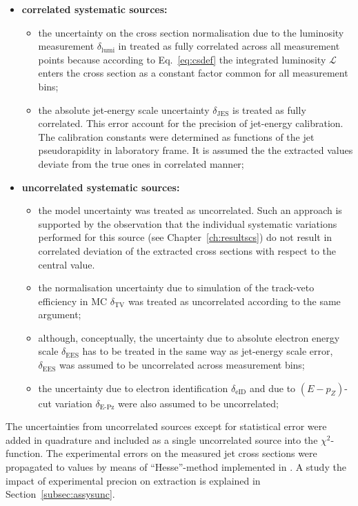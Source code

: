 \begin{itemize}
 \item \textbf{correlated systematic sources:}
 \begin{itemize}
 \item the uncertainty on the cross section normalisation due to the luminosity measurement $\delta_\text{lumi}$ in treated as fully correlated across all measurement points because according to Eq.~\eqref{eq:csdef} the integrated luminosity $\mathcal{L}$ enters the cross section as a constant factor common for all measurement bins;
 \item the absolute jet-energy scale uncertainty $\delta_\text{JES}$ is treated as fully correlated. This error account for the precision of jet-energy calibration. The calibration constants were determined as functions of the jet pseudorapidity in laboratory frame. It is assumed the the extracted values deviate from the true ones in correlated manner;
 \end{itemize}
 \item \textbf{uncorrelated systematic sources:}
 \begin{itemize}
 \item the model uncertainty was treated as uncorrelated. Such an approach is supported by the observation that the individual systematic variations performed for this source (see Chapter~\ref{ch:resultscs}) do not result in correlated deviation of the extracted cross sections with respect to the central value.
 \item the normalisation uncertainty due to simulation of the track-veto efficiency in MC $\delta_\text{TV}$ was treated as uncorrelated according to the same argument;
 \item although, conceptually, the uncertainty due to absolute electron energy scale $\delta_\text{EES}$ has to be treated in the same way as jet-energy scale error, $\delta_\text{EES}$ was assumed to be uncorrelated across measurement bins;
 \item the uncertainty due to electron identification $\delta_\text{eID}$ and due to $\left(E-p_Z\right)$-cut variation $\delta_\text{E-Pz}$ were also assumed to be uncorrelated;
 \end{itemize}
\end{itemize}
The uncertainties from uncorrelated sources except for statistical error were added in quadrature and included as a single uncorrelated source into the $\chi^2$-function. The experimental errors on the measured jet cross sections were propagated to \asz values by means of ``Hesse''-method implemented in \minuit. A study the impact of experimental precion on \asz extraction is explained in Section~\ref{subsec:assysunc}.
